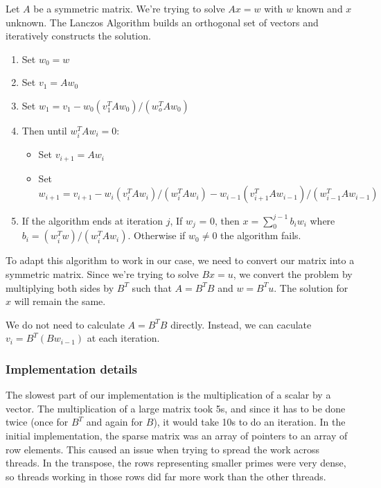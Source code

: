 \documentclass{article}
\begin{document}
        Let $A$ be a symmetric matrix. We're trying to solve $Ax = w$ with $w$ known and $x$ unknown. The Lanczos Algorithm builds an orthogonal set of vectors and iteratively constructs the solution.

        \begin{enumerate}
          \item Set $w_0 = w$
          \item Set $v_1 = Aw_0$
          \item Set $w_1 = v_1 - w_0(v_1^TAw_0)/(w_o^TAw_0)$
          \item Then until $w_i^TAw_i = 0$:
            \begin{itemize}
              \item Set $v_{i+1} = Aw_i$
              \item Set $w_{i+1} = v_{i+1} - w_i(v_i^TAw_i)/(w_i^TAw_i) - w_{i-1}(v_{i+1}^TAw_{i-1})/(w_{i-1}^TAw_{i-1})$
            \end{itemize}
          \item If the algorithm ends at iteration $j$, If $w_j$ = 0, then $x = \sum_0^{j-1} b_iw_i$ where $b_i = (w_i^Tw)/(w_i^TAw_i)$. Otherwise if $w_0 \neq 0$ the algorithm fails.
        \end{enumerate}

        To adapt this algorithm to work in our case, we need to convert our matrix into a symmetric matrix. Since we're trying to solve $Bx = u$, we convert the problem by multiplying both sides by $B^T$ such that $A = B^TB$ and $w = B^Tu$. The solution for $x$ will remain the same.

        We do not need to calculate $A = B^TB$ directly. Instead, we can caculate
        $v_i = B^T(Bw_{i-1})$ at each iteration.

        \subsubsection{Implementation details}

        The slowest part of our implementation is the multiplication of a scalar by a vector. The multiplication of a large matrix took 5s, and since it has to be done twice (once for $B^T$ and again for $B$), it would take 10s to do an iteration. In the initial implementation, the sparse matrix was an array of pointers to an array of row elements. This caused an issue when trying to spread the work across threads. In the transpose, the rows representing smaller primes were very dense, so threads working in those rows did far more work than the other threads.
\end{document}
